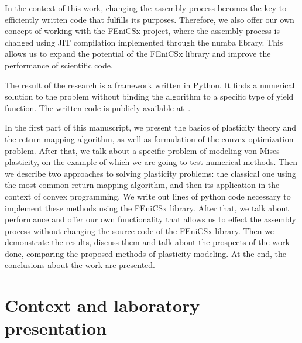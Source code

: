 \documentclass[12pt]{article}
\begin{document}
In the context of this work, changing the assembly process becomes the key to efficiently written code that fulfills its purposes. Therefore, we also offer our own concept of working with the FEniCSx project, where the assembly process is changed using JIT compilation implemented through the numba library. This allows us to expand the potential of the FEniCSx library and improve the performance of scientific code.

The result of the research is a framework written in Python. It finds a numerical solution to the problem without binding the algorithm to a specific type of yield function. The written code is publicly available at~\parencite{convex-plasticity}. 

In the first part of this manuscript, we present the basics of plasticity theory and the return-mapping algorithm, as well as formulation of the convex optimization problem. After that, we talk about a specific problem of modeling von Mises plasticity, on the example of which we are going to test numerical methods. Then we describe two approaches to solving plasticity problems: the classical one using the most common return-mapping algorithm, and then its application in the context of convex programming. We write out lines of python code necessary to implement these methods using the FEniCSx library. After that, we talk about performance and offer our own functionality that allows us to effect the assembly process without changing the source code of the FEniCSx library. Then we demonstrate the results, discuss them and talk about the prospects of the work done, comparing the proposed methods of plasticity modeling. At the end, the conclusions about the work are presented.

\newpage
\section{Context and laboratory presentation}
\end{document}
